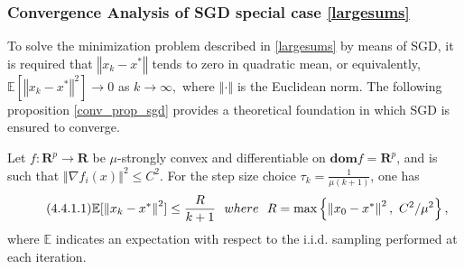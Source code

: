 \subsubsection{Convergence Analysis of SGD special case \ref{largesums}}
To solve the minimization problem described in \ref{largesums} by means of SGD, it is required that $\left\Vert x_{k} - x^{*}\right\Vert$ tends to zero in quadratic mean, or equivalently, $\mathbb{E}[\left\Vert x_{k} - x^{*}\right\Vert^{2}] \rightarrow 0$ as $k \rightarrow \infty,$ where $\left\Vert\cdot\right\Vert$ is the Euclidean norm. The following proposition \ref{conv_prop_sgd} provides a theoretical foundation in which SGD is ensured to converge. 
\begin{proposition}\label{conv_prop_sgd}
Let $f: \mathbf{R}^{p} \longrightarrow \mathbf{R}$ be $\mu$-strongly convex and differentiable on $\textbf{dom}f = \mathbf{R}^{p}$, and is such that $\left\Vert\nabla f_{i}(x)\right\Vert^{2} \leq C^{2}.$ For the step size choice $\tau_{k} = \frac{1}{\mu (k+1)}$, one has
\begin{equation*}\label{bound_conv_SGD}\tag{4.4.1.1}
\mathbb{E}[\left\Vert x_{k} - x^{*}\right\Vert^{2}] \leq \frac{R}{k+1}\text{ }\text{ } where \text{ }\text{ } R = \textnormal{max}\left\{\left\Vert x_{0} - x^{*}\right\Vert^{2},\text{ } C^{2}/\mu^{2}\right\},
\end{equation*}
where $\mathbb{E}$ indicates an expectation with respect to the i.i.d. sampling performed at each iteration.
\end{proposition}
